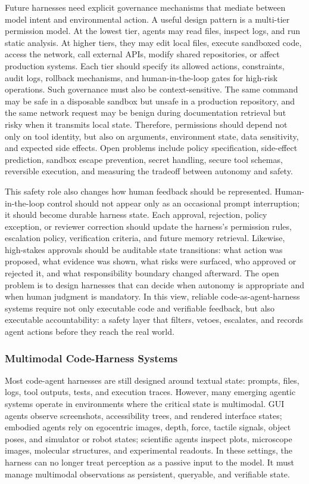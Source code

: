 \documentclass{llmxive}
\begin{document}
Future harnesses need explicit governance mechanisms that mediate between model intent and environmental action. A useful design pattern is a multi-tier permission model. At the lowest tier, agents may read files, inspect logs, and run static analysis. At higher tiers, they may edit local files, execute sandboxed code, access the network, call external APIs, modify shared repositories, or affect production systems. Each tier should specify its allowed actions, constraints, audit logs, rollback mechanisms, and human-in-the-loop gates for high-risk operations. Such governance must also be context-sensitive. The same command may be safe in a disposable sandbox but unsafe in a production repository, and the same network request may be benign during documentation retrieval but risky when it transmits local state. Therefore, permissions should depend not only on tool identity, but also on arguments, environment state, data sensitivity, and expected side effects. Open problems include policy specification, side-effect prediction, sandbox escape prevention, secret handling, secure tool schemas, reversible execution, and measuring the tradeoff between autonomy and safety.


This safety role also changes how human feedback should be represented. Human-in-the-loop control should not appear only as an occasional prompt interruption; it should become durable harness state. Each approval, rejection, policy exception, or reviewer correction should update the harness's permission rules, escalation policy, verification criteria, and future memory retrieval. Likewise, high-stakes approvals should be auditable state transitions: what action was proposed, what evidence was shown, what risks were surfaced, who approved or rejected it, and what responsibility boundary changed afterward. The open problem is to design harnesses that can decide when autonomy is appropriate and when human judgment is mandatory. In this view, reliable code-as-agent-harness systems require not only executable code and verifiable feedback, but also executable accountability: a safety layer that filters, vetoes, escalates, and records agent actions before they reach the real world.

\subsubsection{Multimodal Code-Harness Systems}

Most code-agent harnesses are still designed around textual state: prompts, files, logs, tool outputs, tests, and execution traces. However, many emerging agentic systems operate in environments where the critical state is multimodal. GUI agents observe screenshots, accessibility trees, and rendered interface states; embodied agents rely on egocentric images, depth, force, tactile signals, object poses, and simulator or robot states; scientific agents inspect plots, microscope images, molecular structures, and experimental readouts. In these settings, the harness can no longer treat perception as a passive input to the model. It must manage multimodal observations as persistent, queryable, and verifiable state.
\end{document}
